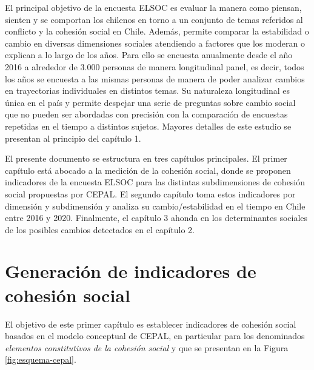\documentclass[
  12pt,
]{book}
\begin{document}
El principal objetivo de la encuesta ELSOC es evaluar la manera como piensan, sienten y se comportan los chilenos en torno a un conjunto de temas referidos al conflicto y la cohesión social en Chile. Además, permite comparar la estabilidad o cambio en diversas dimensiones sociales atendiendo a factores que los moderan o explican a lo largo de los años. Para ello se encuesta anualmente desde el año 2016 a alrededor de 3.000 personas de manera longitudinal panel, es decir, todos los años se encuesta a las mismas personas de manera de poder analizar cambios en trayectorias individuales en distintos temas. Su naturaleza longitudinal es única en el país y permite despejar una serie de preguntas sobre cambio social que no pueden ser abordadas con precisión con la comparación de encuestas repetidas en el tiempo a distintos sujetos. Mayores detalles de este estudio se presentan al principio del capítulo 1.

El presente documento se estructura en tres capítulos principales. El primer capítulo está abocado a la medición de la cohesión social, donde se proponen indicadores de la encuesta ELSOC para las distintas subdimensiones de cohesión social propuestas por CEPAL. El segundo capítulo toma estos indicadores por dimensión y subdimensión y analiza su cambio/estabilidad en el tiempo en Chile entre 2016 y 2020. Finalmente, el capítulo 3 ahonda en los determinantes sociales de los posibles cambios detectados en el capítulo 2.

\hypertarget{generaciuxf3n-de-indicadores-de-cohesiuxf3n-social}{%
\chapter{Generación de indicadores de cohesión social}\label{generaciuxf3n-de-indicadores-de-cohesiuxf3n-social}}

El objetivo de este primer capítulo es establecer indicadores de cohesión social basados en el modelo conceptual de CEPAL, en particular para los denominados \emph{elementos constitutivos de la cohesión social} y que se presentan en la Figura \ref{fig:esquema-cepal}.
\end{document}

